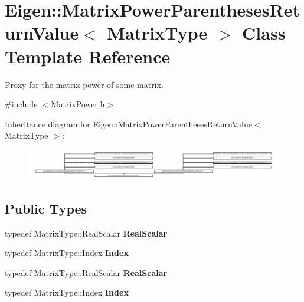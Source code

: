 \hypertarget{class_eigen_1_1_matrix_power_parentheses_return_value}{}\section{Eigen\+:\+:Matrix\+Power\+Parentheses\+Return\+Value$<$ Matrix\+Type $>$ Class Template Reference}
\label{class_eigen_1_1_matrix_power_parentheses_return_value}


Proxy for the matrix power of some matrix.  




{\ttfamily \#include $<$Matrix\+Power.\+h$>$}

Inheritance diagram for Eigen\+:\+:Matrix\+Power\+Parentheses\+Return\+Value$<$ Matrix\+Type $>$\+:\begin{figure}[H]
\begin{center}
\leavevmode
\includegraphics[height=1.350482cm]{class_eigen_1_1_matrix_power_parentheses_return_value}
\end{center}
\end{figure}
\subsection*{Public Types}
\begin{DoxyCompactItemize}
\item 
\mbox{\label{class_eigen_1_1_matrix_power_parentheses_return_value_a13de76f048ccbe3c66224665039bb9e6}} 
typedef Matrix\+Type\+::\+Real\+Scalar {\bfseries Real\+Scalar}
\item 
\mbox{\label{class_eigen_1_1_matrix_power_parentheses_return_value_ad023b03f97799441b28359d869df5a32}} 
typedef Matrix\+Type\+::\+Index {\bfseries Index}
\item 
\mbox{\label{class_eigen_1_1_matrix_power_parentheses_return_value_a13de76f048ccbe3c66224665039bb9e6}} 
typedef Matrix\+Type\+::\+Real\+Scalar {\bfseries Real\+Scalar}
\item 
\mbox{\label{class_eigen_1_1_matrix_power_parentheses_return_value_ad023b03f97799441b28359d869df5a32}} 
typedef Matrix\+Type\+::\+Index {\bfseries Index}
\end{DoxyCompactItemize}
